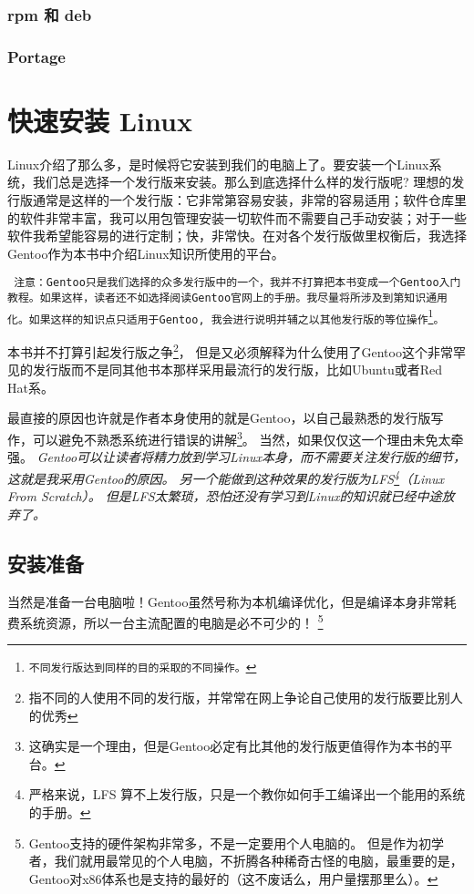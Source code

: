 \documentclass[amstex]{ctexbook}
\newenvironment{notice}{\tt}{}
\begin{document}
\subsection*{rpm 和 deb}
\subsection*{Portage}


\chapter{快速安装 Linux}
Linux介绍了那么多，是时候将它安装到我们的电脑上了。要安装一个Linux系统，我们总是选择一个发行版来安装。那么到底选择什么样的发行版呢? 理想的发行版通常是这样的一个发行版：它非常第容易安装，非常的容易适用；软件仓库里的软件非常丰富，我可以用包管理安装一切软件而不需要自己手动安装；对于一些软件我希望能容易的进行定制；快，非常快。在对各个发行版做里权衡后，我选择Gentoo作为本书中介绍Linux知识所使用的平台。


\begin{notice}
 注意：Gentoo只是我们选择的众多发行版中的一个，我并不打算把本书变成一个Gentoo入门教程。如果这样，读者还不如选择阅读Gentoo官网上的手册。我尽量将所涉及到第知识通用化。如果这样的知识点只适用于Gentoo, 我会进行说明并辅之以其他发行版的等位操作\footnote{不同发行版达到同样的目的采取的不同操作。}。
\end{notice}

本书并不打算引起发行版之争\footnote{指不同的人使用不同的发行版，并常常在网上争论自己使用的发行版要比别人的优秀}，
但是又必须解释为什么使用了Gentoo这个非常罕见的发行版而不是同其他书本那样采用最流行的发行版，比如Ubuntu或者Red Hat系。

最直接的原因也许就是作者本身使用的就是Gentoo，以自己最熟悉的发行版写作，可以避免不熟悉系统进行错误的讲解\footnote{这确实是一个理由，但是Gentoo必定有比其他的发行版更值得作为本书的平台。}。
当然，如果仅仅这一个理由未免太牵强。
\it
Gentoo可以让读者将精力放到学习Linux本身，而不需要关注发行版的细节，这就是我采用Gentoo的原因。
\normalfont
另一个能做到这种效果的发行版为LFS\footnote{严格来说，LFS 算不上发行版，只是一个教你如何手工编译出一个能用的系统的手册。}（Linux From Scratch）。
但是LFS太繁琐，恐怕还没有学习到Linux的知识就已经中途放弃了。


\section{安装准备}

当然是准备一台电脑啦！Gentoo虽然号称为本机编译优化，但是编译本身非常耗费系统资源，所以一台主流配置的电脑是必不可少的！
\footnote{Gentoo支持的硬件架构非常多，不是一定要用个人电脑的。
但是作为初学者，我们就用最常见的个人电脑，不折腾各种稀奇古怪的电脑，最重要的是，Gentoo对x86体系也是支持的最好的（这不废话么，用户量摆那里么）。}
\end{document}
